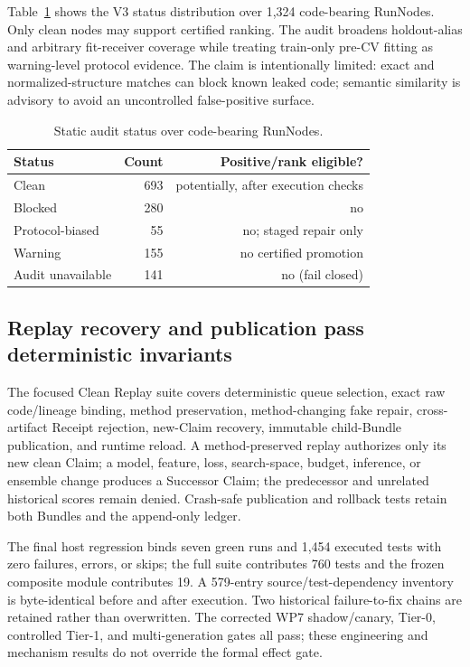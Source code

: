 \documentclass{article}
\begin{document}
Table~\ref{tab:audit} shows the V3 status distribution over 1,324 code-bearing
RunNodes.  Only clean nodes may support certified ranking.  The audit broadens
holdout-alias and arbitrary fit-receiver coverage while treating train-only
pre-CV fitting as warning-level protocol evidence.  The claim is intentionally
limited: exact and normalized-structure matches can block known leaked code;
semantic similarity is advisory to avoid an uncontrolled false-positive
surface.

\begin{table}[t]
\caption{Static audit status over code-bearing RunNodes.}
\label{tab:audit}
\centering
\small
\begin{tabular}{lrr}
\toprule
Status & Count & Positive/rank eligible? \\
\midrule
Clean & 693 & potentially, after execution checks \\
Blocked & 280 & no \\
Protocol-biased & 55 & no; staged repair only \\
Warning & 155 & no certified promotion \\
Audit unavailable & 141 & no (fail closed) \\
\bottomrule
\end{tabular}
\end{table}

\subsection{Replay recovery and publication pass deterministic invariants}

The focused Clean Replay suite covers deterministic queue selection, exact raw
code/lineage binding, method preservation, method-changing fake repair,
cross-artifact Receipt rejection, new-Claim recovery, immutable child-Bundle
publication, and runtime reload.  A method-preserved replay authorizes only its
new clean Claim; a model, feature, loss, search-space, budget, inference, or
ensemble change produces a Successor Claim; the predecessor and unrelated
historical scores remain denied.  Crash-safe publication and rollback tests
retain both Bundles and the append-only ledger.

The final host regression binds seven green runs and 1,454 executed tests with
zero failures, errors, or skips; the full suite contributes 760 tests and the
frozen composite module contributes 19.  A 579-entry source/test-dependency
inventory is byte-identical before and after execution.  Two historical
failure-to-fix chains are retained rather than overwritten.  The corrected WP7
shadow/canary, Tier-0, controlled Tier-1, and multi-generation gates all pass;
these engineering and mechanism results do not override the formal effect
gate.
\end{document}
